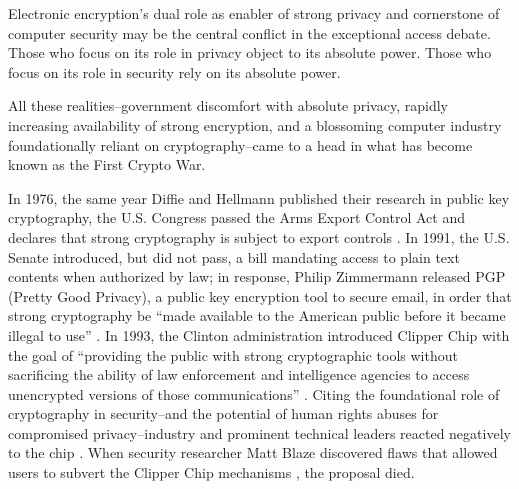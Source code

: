 


Electronic encryption's dual role as enabler of strong privacy and cornerstone of computer security may be the central
conflict in the exceptional access debate. Those who focus on its role in privacy object to its absolute power. Those
who focus on its role in security rely on its absolute power.


All these realities--government discomfort with absolute privacy, rapidly increasing availability of strong encryption,
and a blossoming computer industry foundationally reliant on cryptography--came to a head in what has become known as
the First Crypto War.

In 1976, the same year Diffie and Hellmann published their research in public key cryptography, the U.S. Congress passed
the Arms Export Control Act and declares that strong cryptography is subject to export controls \cite{kehl_right_2015}.
In 1991, the U.S. Senate introduced, but did not pass, a bill mandating access to plain text contents when authorized by
law; in response, Philip Zimmermann released PGP (Pretty Good Privacy), a public key encryption tool to secure email, in
order that strong cryptography be ``made available to the American public before it became illegal to use''
\cite{zimmermann_1996}. In 1993, the Clinton administration introduced Clipper Chip \cite{press_1993} with the goal of
``providing the public with strong cryptographic tools without sacrificing the ability of law enforcement and
intelligence agencies to access unencrypted versions of those communications'' \cite{thompson_2015}. Citing the
foundational role of cryptography in security--and the potential of human rights abuses for compromised
privacy--industry and prominent technical leaders reacted negatively to the chip \cite{kehl_right_2015}
\cite{zimmermann_1996}. When security researcher Matt Blaze discovered flaws that allowed users to subvert the Clipper
Chip mechanisms \cite{blaze_protocol_1994}, the proposal died.


